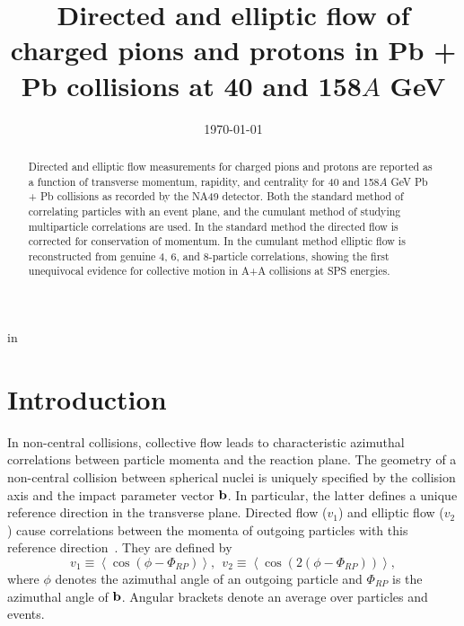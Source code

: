 \documentclass[aps,prc,superscriptaddress,showpacs,floatfix,nofootinbib]{revtex4}
\newcommand{\mean}[1]{\left\langle #1 \right\rangle}
\begin{document}
 in  %

\renewcommand{\topfraction}{0.99}
\renewcommand{\bottomfraction}{0.99}

\renewcommand{\textfraction}{0.01}

\title{
Directed and elliptic flow of charged pions and protons in Pb + Pb
collisions at 40 and 158$A$ GeV}


\date{\today}

\begin{abstract}
Directed and elliptic flow measurements for charged pions and protons
are reported as a function of transverse momentum, rapidity, and
centrality for 40 and 158$A$ GeV Pb + Pb collisions as recorded
by the NA49 detector. Both the standard method of correlating
particles with an event plane, and the cumulant method of studying
multiparticle correlations are used. In the standard method the
directed flow is corrected for conservation of momentum. In the
cumulant method elliptic flow is reconstructed from genuine 4, 6, and
8-particle correlations, showing the first unequivocal evidence for
collective motion in A+A collisions at SPS energies.
\end{abstract}


\maketitle

\section{Introduction}
In non-central collisions, collective flow leads to characteristic
azimuthal correlations between particle momenta and the reaction
plane.  The geometry of a non-central collision between spherical
nuclei is uniquely specified by the collision axis and the impact
parameter vector ${\bf b}$.  In particular, the latter defines a
unique reference direction in the transverse plane.  Directed flow
($v_1$) and elliptic flow ($v_2$) cause correlations between the
momenta of outgoing particles with this reference
direction~\cite{VoZh96}. They are defined by
\begin{equation}
\label{defv1v2}
v_1\equiv\mean{\cos(\phi - \Phi_{RP})},\ \ 
v_2\equiv\mean{\cos(2(\phi - \Phi_{RP}))},
\end{equation}
where $\phi$ denotes the azimuthal angle of an outgoing particle and
$\Phi_{RP}$ is the azimuthal angle of ${\bf b}$. Angular brackets
denote an average over particles and events.
\end{document}

